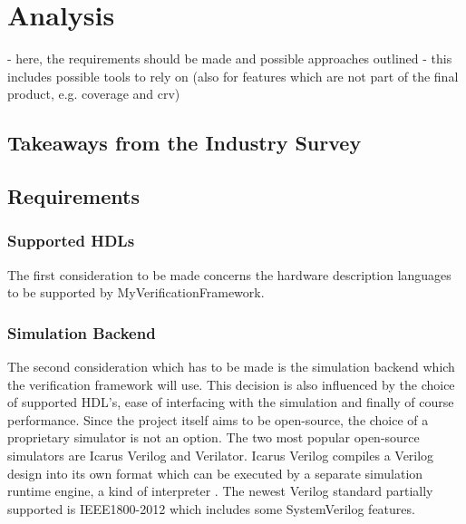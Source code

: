 \documentclass[12pt]{book}
\newcommand{\name}{MyVerificationFramework}
\begin{document}
\begin{comment}
- have own UVM extensions and methodology
- have own scoreboard implementation

- one issue is reset handling in CRV
- own agent for reset handling
- phase hopping is difficult and messy

- see most issues with SV limitations
- parameterized interfaces 
- verbose
- boiler plate

- but prefers guidelines over limitations for UVM

- prefers to keep verification code simle and understandable, also for RTL engineers
- does not like overly complex features like event callbacks

\end{comment}



\chapter{Analysis} %

- here, the requirements should be made and possible approaches outlined
- this includes possible tools to rely on (also for features which are not part of the final product, e.g. coverage and crv)

\section{Takeaways from the Industry Survey}




\section{Requirements} %

\subsection{Supported HDLs}
The first consideration to be made concerns the hardware description languages to be supported by \name. 

\subsection{Simulation Backend}
The second consideration which has to be made is the simulation backend which the verification framework will use. This decision is also influenced by the choice of supported HDL's, ease of interfacing with the simulation and finally of course performance. Since the project itself aims to be open-source, the choice of a proprietary simulator is not an option. The two most popular open-source simulators are Icarus Verilog and Verilator. Icarus Verilog compiles a Verilog design into its own format which can be executed by a separate simulation runtime engine, a kind of interpreter \cite{iverilog}. The newest Verilog standard partially supported is IEEE1800-2012 which includes some SystemVerilog features. 
\end{document}
